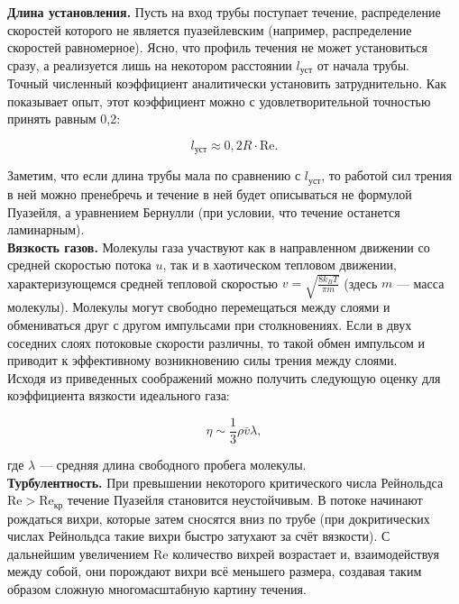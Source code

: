 \documentclass[a4paper]{article}
\begin{document}
	\textbf{Длина установления.} Пусть на вход трубы поступает течение, распределение скоростей которого не является пуазейлевским (например, распределение скоростей равномерное). Ясно, что профиль течения не может установиться сразу, а реализуется лишь на некотором расстоянии $l_{\text{уст}}$ от начала трубы.\\
	
	Точный численный коэффициент аналитически установить затруднительно. Как показывает опыт, этот коэффициент можно с удовлетворительной точностью принять равным 0,2:
	
	\[
	l_{\text{уст}} \approx 0,2R \cdot \text{Re}.
	\]
	
	Заметим, что если длина трубы мала по сравнению с $l_{\text{уст}}$, то работой сил трения в ней можно пренебречь и течение в ней будет описываться не формулой Пуазейля, а уравнением Бернулли (при условии, что течение останется ламинарным).\\
	
	\textbf{Вязкость газов.} Молекулы газа участвуют как в направленном движении со средней скоростью потока $u$, так и в хаотическом тепловом движении, характеризующемся средней тепловой скоростью $v = \sqrt{\frac{8k_B T}{\pi m}}$ (здесь $m$ — масса молекулы). Молекулы могут свободно перемещаться между слоями и обмениваться друг с другом импульсами при столкновениях. Если в двух соседних слоях потоковые скорости различны, то такой обмен импульсом и приводит к эффективному возникновению силы трения между слоями.\\
	
	Исходя из приведенных соображений можно получить следующую оценку для коэффициента вязкости идеального газа:
	
	\[
	\eta \sim \frac{1}{3} \rho \bar{v} \lambda,
	\]
	
	где $\lambda$ — средняя длина свободного пробега молекулы.\\
	
	\textbf{Турбулентность.} При превышении некоторого критического числа Рейнольдса $\text{Re} > \text{Re}_{\text{кр}}$ течение Пуазейля становится неустойчивым. В потоке начинают рождаться вихри, которые затем сносятся вниз по трубе (при докритических числах Рейнольдса такие вихри быстро затухают за счёт вязкости). С дальнейшим увеличением $\text{Re}$ количество вихрей возрастает и, взаимодействуя между собой, они порождают вихри всё меньшего размера, создавая таким образом сложную многомасштабную картину течения.\\
	
\end{document}
